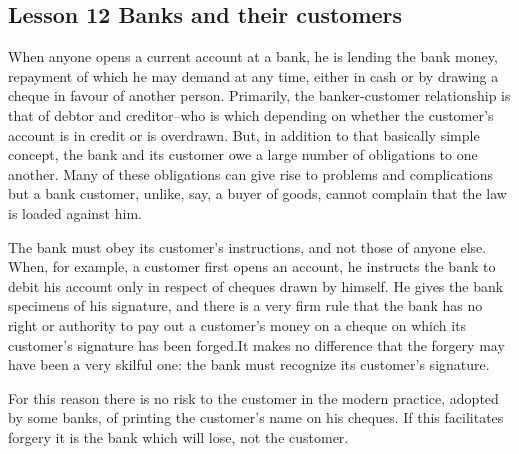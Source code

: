 \documentclass[kindlepaper]{BHCexam4kindle}
\begin{document}
\subsection{Lesson 12
Banks and their customers}
\par
When anyone opens a current account at a bank, he is lending the bank money, repayment of which he
may demand at any time, either in cash or by drawing a cheque in favour of another person. Primarily, the
banker-customer relationship is that of debtor and creditor--who is which depending on whether the customer's
account is in credit or is overdrawn. But, in addition to that basically simple concept, the bank and its customer
owe a large number of obligations to one another. Many of these obligations can give rise to problems and
complications but a bank customer, unlike, say, a buyer of goods, cannot complain that the law is loaded
against him.
\par
The bank must obey its customer's instructions, and not those of anyone else. When, for example, a
customer first opens an account, he instructs the bank to debit his account only in respect of cheques drawn by
himself. He gives the bank specimens of his signature, and there is a very firm rule that the bank has no right
or authority to pay out a customer's money on a cheque on which its customer's signature has been forged.It
makes no difference that the forgery may have been a very skilful one: the bank must recognize its customer's
signature.
\par
For this reason there is no risk to the customer in the modern practice, adopted by some banks, of printing
the customer's name on his cheques. If this facilitates forgery it is the bank which will lose, not the customer.
\clearpage
\end{document}
